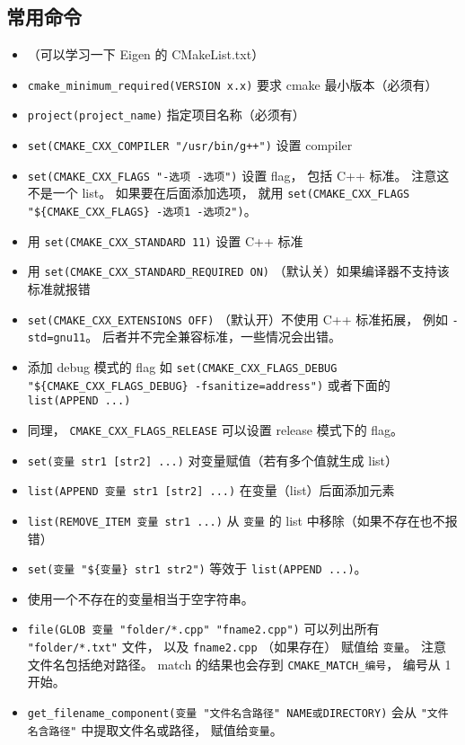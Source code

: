\subsection{常用命令}
\begin{itemize}
\item （可以学习一下 Eigen 的 CMakeList.txt）
\item \verb`cmake_minimum_required(VERSION x.x)` 要求 cmake 最小版本（必须有）
\item \verb`project(project_name)` 指定项目名称（必须有）
\item \verb|set(CMAKE_CXX_COMPILER "/usr/bin/g++")| 设置 compiler
\item \verb|set(CMAKE_CXX_FLAGS "-选项 -选项")| 设置 flag， 包括 C++ 标准。 注意这不是一个 list。 如果要在后面添加选项， 就用 \verb|set(CMAKE_CXX_FLAGS "${CMAKE_CXX_FLAGS} -选项1 -选项2")|。
\item 用 \verb|set(CMAKE_CXX_STANDARD 11)| 设置 C++ 标准
\item 用 \verb|set(CMAKE_CXX_STANDARD_REQUIRED ON)| （默认关）如果编译器不支持该标准就报错
\item \verb|set(CMAKE_CXX_EXTENSIONS OFF)| （默认开）不使用 C++ 标准拓展， 例如 \verb|-std=gnu11|。 后者并不完全兼容标准，一些情况会出错。
\item 添加 debug 模式的 flag 如 \verb|set(CMAKE_CXX_FLAGS_DEBUG "${CMAKE_CXX_FLAGS_DEBUG} -fsanitize=address")| 或者下面的 \verb`list(APPEND ...)`
\item 同理， \verb|CMAKE_CXX_FLAGS_RELEASE| 可以设置 release 模式下的 flag。
\item \verb`set(变量 str1 [str2] ...)` 对变量赋值（若有多个值就生成 list）
\item \verb`list(APPEND 变量 str1 [str2] ...)` 在变量（list）后面添加元素
\item \verb|list(REMOVE_ITEM 变量 str1 ...)| 从 \verb|变量| 的 list 中移除（如果不存在也不报错）
\item \verb|set(变量 "${变量} str1 str2")| 等效于 \verb`list(APPEND ...)`。
\item 使用一个不存在的变量相当于空字符串。
\item \verb`file(GLOB 变量 "folder/*.cpp" "fname2.cpp")` 可以列出所有 \verb|"folder/*.txt"| 文件， 以及 \verb|fname2.cpp| （如果存在） 赋值给 \verb|变量|。 注意文件名包括绝对路径。 match 的结果也会存到 \verb|CMAKE_MATCH_编号|， 编号从 1 开始。
\item \verb|get_filename_component(变量 "文件名含路径" NAME或DIRECTORY)| 会从 \verb|"文件名含路径"| 中提取文件名或路径， 赋值给\verb|变量|。

\end{itemize}
